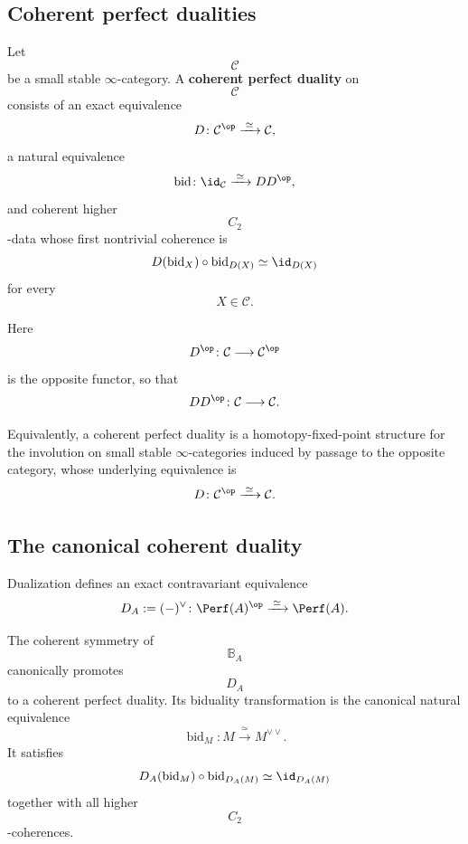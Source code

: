 \subsection{Coherent perfect dualities}

\begin{definition}
\label{def:coherent-perfect-duality}
Let
\[
    \mathcal C
\]
be a small stable $\infty$-category. A
\textbf{coherent perfect duality} on
\[
    \mathcal C
\]
consists of an exact equivalence
\[
    D
    \colon
    \mathcal C^{\op}
    \xrightarrow{\;\simeq\;}
    \mathcal C,
\]
a natural equivalence
\[
    \operatorname{bid}
    \colon
    \id_{\mathcal C}
    \xrightarrow{\;\simeq\;}
    D D^{\op},
\]
and coherent higher
\[
    C_2
\]
-data whose first nontrivial coherence is
\[
    D(\operatorname{bid}_X)
    \circ
    \operatorname{bid}_{D(X)}
    \simeq
    \id_{D(X)}
\]
for every
\[
    X\in\mathcal C.
\]

Here
\[
    D^{\op}
    \colon
    \mathcal C
    \longrightarrow
    \mathcal C^{\op}
\]
is the opposite functor, so that
\[
    D D^{\op}
    \colon
    \mathcal C
    \longrightarrow
    \mathcal C.
\]

Equivalently, a coherent perfect duality is a homotopy-fixed-point
structure for the involution on small stable $\infty$-categories induced
by passage to the opposite category, whose underlying equivalence is
\[
    D
    \colon
    \mathcal C^{\op}
    \xrightarrow{\;\simeq\;}
    \mathcal C.
\]
\end{definition}


\subsection{The canonical coherent duality}

\begin{proposition}
\label{prop:canonical-perfect-duality}
Dualization defines an exact contravariant equivalence
\[
    D_A
    :=
    (-)^\vee
    \colon
    \Perf(A)^{\op}
    \xrightarrow{\;\simeq\;}
    \Perf(A).
\]

The coherent symmetry of
\[
    \mathbb B_A
\]
canonically promotes
\[
    D_A
\]
to a coherent perfect duality. Its biduality transformation is the
canonical natural equivalence
\[
    \operatorname{bid}_M
    \colon
    M
    \xrightarrow{\;\simeq\;}
    M^{\vee\vee}.
\]
It satisfies
\[
    D_A(\operatorname{bid}_M)
    \circ
    \operatorname{bid}_{D_A(M)}
    \simeq
    \id_{D_A(M)}
\]
together with all higher
\[
    C_2
\]
-coherences.
\end{proposition}

